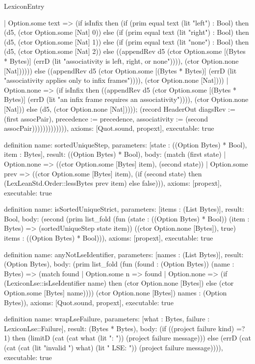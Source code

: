 \begin{lexlean}{LexiconEntry}
\begin{semanticmodule}
{    | Option.some text => (if isInfix then (if (prim equal text (lit "left") : Bool) then (d5, (ctor Option.some [Nat] 0)) else (if (prim equal text (lit "right") : Bool) then (d5, (ctor Option.some [Nat] 1)) else (if (prim equal text (lit "none") : Bool) then (d5, (ctor Option.some [Nat] 2)) else ((appendRev d5 (ctor Option.some [(Bytes * Bytes)] (errD (lit "associativity is left, right, or none")))), (ctor Option.none [Nat]))))) else ((appendRev d5 (ctor Option.some [(Bytes * Bytes)] (errD (lit "associativity applies only to infix frames")))), (ctor Option.none [Nat])))
    | Option.none => (if isInfix then ((appendRev d5 (ctor Option.some [(Bytes * Bytes)] (errD (lit "an infix frame requires an associativity")))), (ctor Option.none [Nat])) else (d5, (ctor Option.none [Nat])))); (record HeaderOut {diagsRev := (first assocPair), precedence := precedence, associativity := (second assocPair)})))))))))))),
  axioms: [Quot.sound, propext],
  executable: true
}

definition{
  name: sortedUniqueStep,
  parameters: [state : ((Option Bytes) * Bool), item : Bytes],
  result: ((Option Bytes) * Bool),
  body: (match (first state)
    | Option.none => ((ctor Option.some [Bytes] item), (second state))
    | Option.some prev => ((ctor Option.some [Bytes] item), (if (second state) then (LexLeanStd.Order::lessBytes prev item) else false))),
  axioms: [propext],
  executable: true
}

definition{
  name: isSortedUniqueStrict,
  parameters: [items : (List Bytes)],
  result: Bool,
  body: (second (prim list_fold (fun (state : ((Option Bytes) * Bool)) (item : Bytes) => (sortedUniqueStep state item)) ((ctor Option.none [Bytes]), true) items : ((Option Bytes) * Bool))),
  axioms: [propext],
  executable: true
}

definition{
  name: anyNotLseIdentifier,
  parameters: [names : (List Bytes)],
  result: (Option Bytes),
  body: (prim list_fold (fun (found : (Option Bytes)) (name : Bytes) => (match found
    | Option.some n => found
    | Option.none => (if (LexiconLse::isLseIdentifier name) then (ctor Option.none [Bytes]) else (ctor Option.some [Bytes] name)))) (ctor Option.none [Bytes]) names : (Option Bytes)),
  axioms: [Quot.sound, propext],
  executable: true
}

definition{
  name: wrapLseFailure,
  parameters: [what : Bytes, failure : LexiconLse::Failure],
  result: (Bytes * Bytes),
  body: (if ((project failure kind) =? 1) then (limitD (cat (cat what (lit ": ")) (project failure message))) else (errD (cat (cat (cat (lit "invalid ") what) (lit " LSE: ")) (project failure message)))),
  executable: true
}


\end{semanticmodule}
\end{lexlean}
